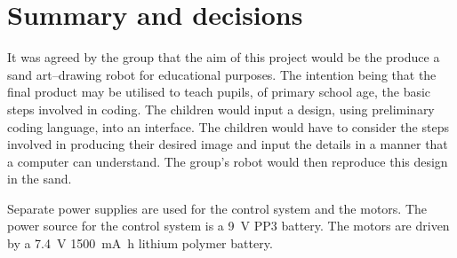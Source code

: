     \label{outline: motors}



\section{Summary and decisions}
    It was agreed by the group that the aim of this project would be the produce a sand art--drawing robot for educational purposes. The intention being that the final product may be utilised to teach pupils, of primary school age, the basic steps involved in coding.
    The children would input a design, using preliminary coding language, into an interface. The children would have to consider the steps involved in producing their desired image and input the details in a manner that a computer can understand. The group's robot would then reproduce this design in the sand.







    Separate power supplies are used for the control system and the motors. The power source for the control system is a \SI{9}{\volt} PP3 battery. The motors are driven by a \SI{7.4}{\volt} \SI{1500}{\milli\ampere\hour} lithium polymer battery.


